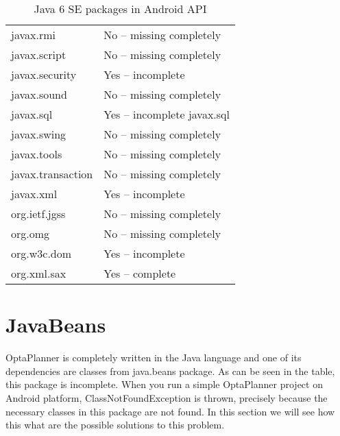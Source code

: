 \begin {table}[h!]
\begin{tabular}{|l|l|}
javax.rmi		        & No -- missing completely    \\
javax.script	        & No -- missing completely    \\
javax.security          & Yes -- incomplete            \\
javax.sound             & No -- missing completely    \\
javax.sql	            & Yes -- incomplete javax.sql  \\
javax.swing	            & No -- missing completely    \\
javax.tools	            & No -- missing completely    \\
javax.transaction	    & No -- missing completely    \\
javax.xml	            & Yes -- incomplete            \\
org.ietf.jgss	        & No -- missing completely    \\
org.omg                 & No -- missing completely    \\
org.w3c.dom             & Yes -- incomplete            \\
org.xml.sax	            & Yes -- complete              \\
\hline
\end{tabular}
\centering
\caption{Java 6 SE packages in Android API}
\label{javaDiff}
\end{table}

\section{JavaBeans}
OptaPlanner is completely written in the Java language and one of its dependencies are classes from java.beans package. As can be seen in the table, this package is incomplete. When you run a simple OptaPlanner project on Android platform, ClassNotFoundException is thrown, precisely because the necessary classes in this package are not found. In this section we will see how this what are the possible solutions to this problem.

